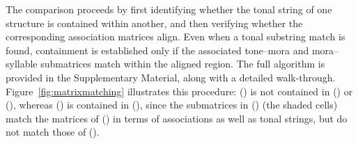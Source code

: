 The comparison proceeds by first identifying whether the tonal string of one
structure is contained within another, and then verifying whether the
corresponding association matrices align. Even when a tonal substring match
is found, containment is established only if the associated tone--mora and
mora--syllable submatrices match within the aligned region. The full algorithm
is provided in the Supplementary Material, along with a detailed walk-through.
Figure~\ref{fig:matrixmatching} illustrates this procedure:
() is not contained in
() or (),
whereas () is contained in
(), since the submatrices in
() (the shaded cells) match the matrices of
() in terms of associations
as well as tonal strings, but do not match those of
().
